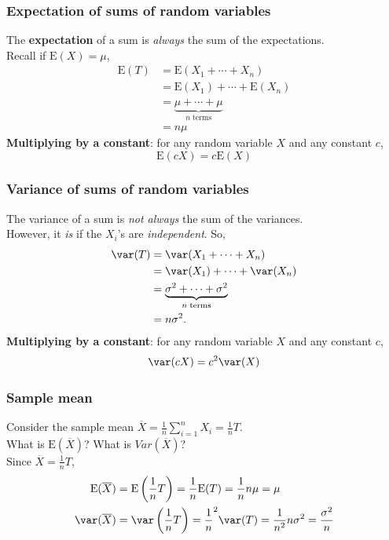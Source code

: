 \documentclass[a4paper]{article}\usepackage[]{graphicx}\usepackage[]{xcolor}
\begin{document}
\subsubsection{Expectation of sums of random variables}
The \textbf{expectation} of a sum is \textit{always} the sum of the expectations.\\
Recall if \( \mathrm{E}(X) = \mu \),
\begin{align*}
	\mathrm{\mathrm{E}}(T) &= \mathrm{\mathrm{E}}(X_1 + \dotsb + X_n)\\
				  &= \mathrm{\mathrm{E}}(X_1) + \dotsb + \mathrm{\mathrm{E}}(X_n)\\
				  &= \underbrace{\mu + \dotsb + \mu}_{n\;\text{terms}}\\
				  &= n \mu
\end{align*}
\textbf{Multiplying by a constant}: for any random variable \( X \) and any constant \( c \),
\[
	\mathrm{\mathrm{E}}(cX) = c\mathrm{\mathrm{E}}(X)
\]
\subsubsection{Variance of sums of random variables}
The variance of a sum is \textit{not always} the sum of the variances.\\
However, it \textit{is} if the \( X_i \)'s are \textit{independent}. So,
\begin{align*}
	\var(T) &= \var(X_1 + \dotsb + X_n)\\
				  &= \var(X_1) + \dotsb + \var(X_n)\\
				  &= \underbrace{\sigma^2 + \dotsb + \sigma^{2}}_{n\;\text{terms}}\\
				  &= n \sigma^{2}.
\end{align*}
\textbf{Multiplying by a constant}: for any random variable \( X \) and any constant \( c \),
\[
	\var(cX) = c^{2}\var(X)
\]
\subsubsection{Sample mean}
Consider the sample mean \( \overline{X} = \frac{1}{n}\sum_{i=1}^{n} X_i = \frac{1}{n} T \).\\
What is \( \mathrm{\mathrm{E}}(\overline{X}) \)? What is \( Var(\overline{X}) \)?\\
Since \( \overline{X} = \frac{1}{n}T \),
\begin{align*}
	\mathrm{\mathrm{E}}(\overline{X}) &= \mathrm{\mathrm{E}}\left( \frac{1}{n} T \right) = \frac{1}{n} \mathrm{\mathrm{E}}(T) = \frac{1}{n} n \mu = \mu\\
	\var(\overline{X}) &= \var\left( \frac{1}{n} T \right) = \frac{1}{n}^{2} \var(T) = \frac{1}{n^{2}} n \sigma^{2} = \frac{\sigma^{2}}{n}
\end{align*}
\end{document}
